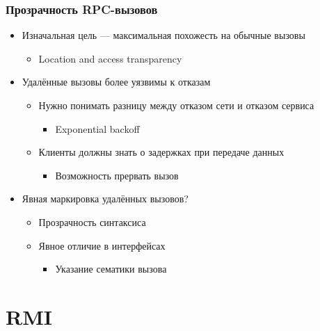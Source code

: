 \documentclass[xetex,mathserif,serif]{beamer}
\begin{document}
	\begin{frame}
		\frametitle{Прозрачность RPC-вызовов}
		\begin{itemize}
			\item Изначальная цель --- максимальная похожесть на обычные вызовы
			\begin{itemize}
				\item Location and access transparency
			\end{itemize}
			\item Удалённые вызовы более уязвимы к отказам
			\begin{itemize}
				\item Нужно понимать разницу между отказом сети и отказом сервиса
				\begin{itemize}
					\item Exponential backoff
				\end{itemize}
				\item Клиенты должны знать о задержках при передаче данных
				\begin{itemize}
					\item Возможность прервать вызов
				\end{itemize}
			\end{itemize}
			\item Явная маркировка удалённых вызовов?
			\begin{itemize}
				\item Прозрачность синтаксиса
				\item Явное отличие в интерфейсах
				\begin{itemize}
					\item Указание сематики вызова
				\end{itemize}
			\end{itemize}
		\end{itemize}
	\end{frame}

	\section{RMI}
\end{document}

